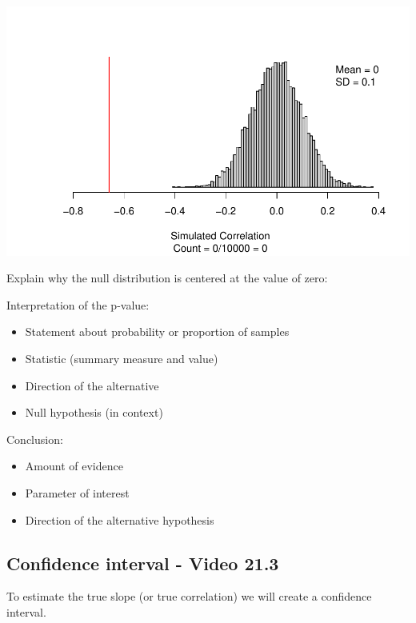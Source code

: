 \documentclass[
]{report}
\begin{document}
\begin{center}\includegraphics[width=0.7\linewidth]{13-VN13-regression_files/figure-latex/unnamed-chunk-14-1} \end{center}

Explain why the null distribution is centered at the value of zero:

\vspace{0.5in}

Interpretation of the p-value:

\begin{itemize}
\item
  Statement about probability or proportion of samples
\item
  Statistic (summary measure and value)
\item
  Direction of the alternative
\item
  Null hypothesis (in context)
\end{itemize}

\vspace{0.8in}

Conclusion:

\begin{itemize}
\item
  Amount of evidence
\item
  Parameter of interest
\item
  Direction of the alternative hypothesis
\end{itemize}

\vspace{0.6in}

\subsection*{Confidence interval - Video 21.3}\label{confidence-interval---video-21.3}

To estimate the true slope (or true correlation) we will create a confidence interval.
\end{document}

